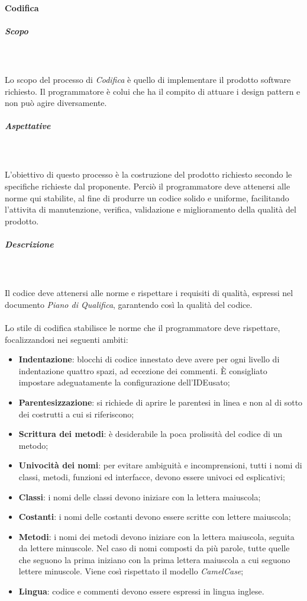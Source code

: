 	\paragraph{Codifica}
		\subparagraph*{Scopo}\mbox{} \\ \mbox{} \\
		Lo scopo del processo di \textit{Codifica} è quello di implementare il prodotto software richiesto. Il programmatore è colui che ha il compito di attuare i design pattern e non può agire diversamente.
		\subparagraph*{Aspettative}\mbox{} \\ \mbox{} \\
		L'obiettivo di questo processo è la costruzione del prodotto richiesto secondo le specifiche richieste dal proponente. Perciò il programmatore deve attenersi alle norme qui stabilite, al fine di produrre un codice solido e uniforme, facilitando l'attivita di manutenzione, verifica, validazione e miglioramento della qualità del prodotto.
		\subparagraph*{Descrizione}\mbox{} \\ \mbox{} \\
		Il codice deve attenersi alle norme e rispettare i requisiti di qualità, espressi nel documento \textit{Piano di Qualifica}, garantendo così la qualità del codice.
		 \mbox{} \\ \mbox{} \\
		Lo stile di codifica stabilisce le norme che il programmatore deve rispettare, focalizzandosi nei seguenti ambiti:
		\begin{itemize}
			\item \textbf{Indentazione}: blocchi di codice innestato deve avere per ogni livello di indentazione quattro spazi, ad eccezione dei commenti. È consigliato impostare adeguatamente la configurazione dell'IDE\glo usato;
			\item \textbf{Parentesizzazione}: si richiede di aprire le parentesi in linea e non al di sotto dei costrutti a cui si riferiscono;
			\item \textbf{Scrittura dei metodi}: è desiderabile la poca prolissità del codice di un metodo;
			\item \textbf{Univocità dei nomi}: per evitare ambiguità e incomprensioni, tutti i nomi di classi, metodi, funzioni ed interfacce, devono essere univoci ed esplicativi;
			\item \textbf{Classi}: i nomi delle classi devono iniziare con la lettera maiuscola;
			\item \textbf{Costanti}: i nomi delle costanti devono essere scritte con lettere maiuscola;
			\item \textbf{Metodi}: i nomi dei metodi devono iniziare con la lettera maiuscola, seguita da lettere minuscole. Nel caso di nomi composti da più parole, tutte quelle che seguono la prima iniziano con la prima lettera maiuscola a cui seguono lettere minuscole. Viene così rispettato il modello \textit{CamelCase}\glo;
			\item \textbf{Lingua}: codice e commenti devono essere espressi in lingua inglese.
		\end{itemize}

